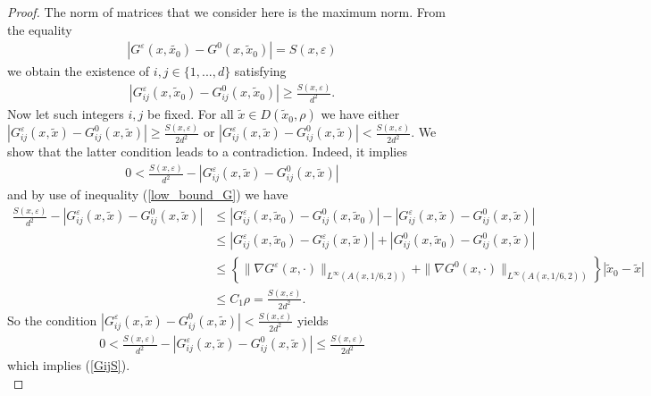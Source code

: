 \documentclass[11pt, reqno]{amsart}
\theoremstyle{definition}
\theoremstyle{remark}
\numberwithin{equation}{section}
\begin{document}
\begin{proof}[Proof]
			\noindent The norm of matrices that we consider here is the maximum norm. From the equality
			\begin{align*}
				| G^\varepsilon(x,\tilde{x_0})- G^0(x,\tilde{x}_0)|=S(x,\varepsilon)
			\end{align*}
			we obtain the existence of $i,j\in\{ 1,...,d\}$ satisfying 
			\begin{align}
				| G_{ij}^\varepsilon(x,\tilde{x}_0)- G_{ij}^0(x,\tilde{x}_0)|\geq \frac{S(x,\varepsilon)}{d^2}.\label{low_bound_G}
			\end{align}
			Now let such integers $i,j$ be fixed. For all $\tilde{x}\in D(\tilde{x}_0, \rho)$ we have either 	$| G_{ij}^\varepsilon(x,\tilde{x})- G_{ij}^0(x,\tilde{x})|\geq \frac{S(x,\varepsilon)}{2d^2}$ or 	$| G_{ij}^\varepsilon(x,\tilde{x})- G_{ij}^0(x,\tilde{x})|< \frac{S(x,\varepsilon)}{2d^2}$. We show that the latter condition leads to a contradiction. Indeed, it implies 
			\begin{align*}
				0<	\frac{S(x,\varepsilon)}{d^2} -| G_{ij}^\varepsilon(x,\tilde{x})- G_{ij}^0(x,\tilde{x})|
			\end{align*}
			and by use of 
			inequality (\ref{low_bound_G}) we have
			\begin{align*}
				\frac{S(x,\varepsilon)}{d^2} -| G_{ij}^\varepsilon(x,\tilde{x})- G_{ij}^0(x,\tilde{x})|&\leq	| G_{ij}^\varepsilon(x,\tilde{x}_0)- G_{ij}^0(x,\tilde{x}_0)|-| G_{ij}^\varepsilon(x,\tilde{x})- G_{ij}^0(x,\tilde{x})|\\
				&\leq	| G_{ij}^\varepsilon(x,\tilde{x}_0)-G_{ij}^\varepsilon(x,\tilde{x}) |+|G_{ij}^0(x,\tilde{x}_0) - G_{ij}^0(x,\tilde{x})|\\
				&\leq	\left\{  \| \nabla G^\varepsilon(x,\cdot) \|_{L^\infty(A(x,1/6,2))} + \| \nabla G^0(x,\cdot) \|_{L^\infty(A(x,1/6,2))} \right\}|\tilde{x}_0-\tilde{x}|  \\
				&\leq	C_1 \rho =\frac{S(x,\varepsilon)}{2d^2} .
			\end{align*}
			So the condition 	$| G_{ij}^\varepsilon(x,\tilde{x})- G_{ij}^0(x,\tilde{x})|< \frac{S(x,\varepsilon)}{2d^2}$ yields \begin{align*}
				0<\frac{S(x,\varepsilon)}{d^2} -| G_{ij}^\varepsilon(x,\tilde{x})- G_{ij}^0(x,\tilde{x})|\leq	\frac{S(x,\varepsilon)}{2d^2} 
			\end{align*}
			which implies (\ref{GijS}).\\
			

\end{proof}
\end{document}

